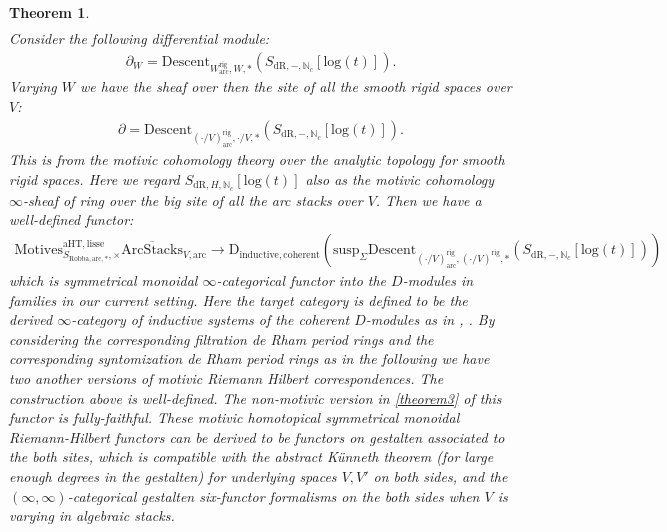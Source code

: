 \documentclass[12pt]{article}
\newtheorem{theorem}{Theorem}
\theoremstyle{definition}
\begin{document}
\begin{theorem}
\begin{align}
\end{align}
Consider the following differential module:
\begin{align}
\partial_W=\mathrm{Descent}_{W^\mathrm{rig}_\mathrm{arc},W,*}(S_{\mathrm{dR},-,\mathbb{N}_c}[\mathrm{log}(t)]).
\end{align}
Varying $W$ we have the sheaf over then the site of all the smooth rigid spaces over $V$:
\begin{align}
\partial=\mathrm{Descent}_{(\cdot/V)^\mathrm{rig}_\mathrm{arc},\cdot/V,*}(S_{\mathrm{dR},-,\mathbb{N}_c}[\mathrm{log}(t)]).
\end{align}
This is from the motivic cohomology theory over the analytic topology for smooth rigid spaces. Here we regard $S_{\mathrm{dR},H,\mathbb{N}_c}[\mathrm{log}(t)]$ also as the motivic cohomology $\infty$-sheaf of ring over the big site of all the arc stacks over $V$. Then we have a well-defined functor:
\begin{align}
\mathrm{Motives}^{\mathrm{aHT},\mathrm{lisse}}_{S_{\mathrm{Robba},\mathrm{arc},*},\times}\overline{\mathrm{ArcStacks}}_{V,\mathrm{arc}}\longrightarrow \mathrm{D}_{\mathrm{inductive},\mathrm{coherent}}(\mathrm{susp}_\Sigma\mathrm{Descent}_{(\cdot/V)^\mathrm{rig}_\mathrm{arc},(\cdot/V)^\mathrm{rig},*}(S_{\mathrm{dR},-,\mathbb{N}_c}[\mathrm{log}(t)]))
\end{align}
which is symmetrical monoidal $\infty$-categorical functor into the $D$-modules in families in our current setting. Here the target category is defined to be the derived $\infty$-category of inductive systems of the coherent $D$-modules as in \cite{5GR1}, \cite{5GR2}. By considering the corresponding filtration de Rham period rings and the corresponding syntomization de Rham period rings as in the following we have two another versions of motivic Riemann Hilbert correspondences. The construction above is well-defined. The non-motivic version in \cref{theorem3} of this functor is fully-faithful. These motivic homotopical symmetrical monoidal Riemann-Hilbert functors can be derived to be functors on gestalten associated to the both sites, which is compatible with the abstract K\"unneth theorem (for large enough degrees in the gestalten) for underlying spaces $V,V'$ on both sides, and the $(\infty,\infty)$-categorical gestalten six-functor formalisms on the both sides when $V$ is varying in algebraic stacks.
\end{theorem}
\end{document}
